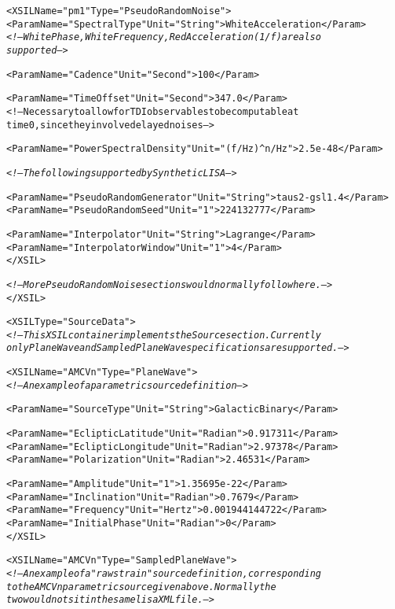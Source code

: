 \documentclass[11pt]{report}
\begin{document}
\begin{alltt}
        <XSIL Name="pm1" Type="PseudoRandomNoise">
            <Param Name="SpectralType" Unit="String">WhiteAcceleration</Param>
            \textsl{<!-- WhitePhase, WhiteFrequency, RedAcceleration (1/f) are also
                 supported -->}

            <Param Name="Cadence" Unit="Second">100</Param>

            <Param Name="TimeOffset" Unit="Second">347.0</Param>
            <!-- Necessary to allow for TDI observables to be computable at
                 time 0, since they involve delayed noises --> 
		              
            <Param Name="PowerSpectralDensity" Unit="(f/Hz)^n/Hz">2.5e-48</Param>

            \textsl{<!-- The following supported by Synthetic LISA -->}

            <Param Name="PseudoRandomGenerator" Unit="String">taus2-gsl1.4</Param>
            <Param Name="PseudoRandomSeed" Unit="1">224132777</Param>

            <Param Name="Interpolator" Unit="String">Lagrange</Param>
            <Param Name="InterpolatorWindow" Unit="1">4</Param>           
		 </XSIL>

		 \textsl{<!-- More PseudoRandomNoise sections would normally follow here. -->}
    </XSIL>

    <XSIL Type="SourceData">
        \textsl{<!-- This XSIL container implements the Source section. Currently
             only PlaneWave and SampledPlaneWave specifications are supported. -->}
             
        <XSIL Name="AMCVn" Type="PlaneWave">
            \textsl{<!-- An example of a parametric source definition -->}

            <Param Name="SourceType" Unit="String">GalacticBinary</Param>
            
            <Param Name="EclipticLatitude" Unit="Radian">0.917311</Param>
            <Param Name="EclipticLongitude" Unit="Radian">2.97378</Param>
            <Param Name="Polarization" Unit="Radian">2.46531</Param>
            
            <Param Name="Amplitude" Unit="1">1.35695e-22</Param>
            <Param Name="Inclination" Unit="Radian">0.7679</Param>
            <Param Name="Frequency" Unit="Hertz">0.001944144722</Param>
            <Param Name="InitialPhase" Unit="Radian">0</Param>
        </XSIL>

        <XSIL Name="AMCVn" Type="SampledPlaneWave">
            \textsl{<!-- An example of a "raw strain" source definition, corresponding
                 to the AMCVn parametric source given above. Normally the
                 two would not sit in the same lisaXML file. -->}


\end{alltt}
\end{document}
